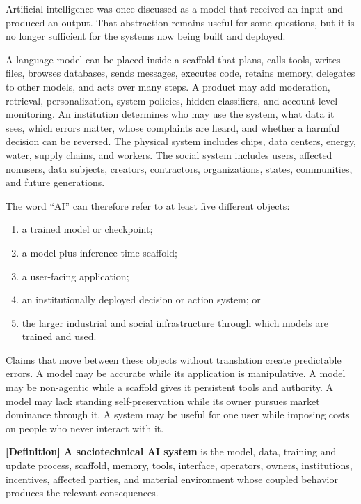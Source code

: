 \documentclass[
  11pt,
]{article}
\providecommand{\tightlist}{%
  \setlength{\itemsep}{0pt}\setlength{\parskip}{0pt}}
\begin{document}
Artificial intelligence was once discussed as a model that received an
input and produced an output. That abstraction remains useful for some
questions, but it is no longer sufficient for the systems now being
built and deployed.

A language model can be placed inside a scaffold that plans, calls
tools, writes files, browses databases, sends messages, executes code,
retains memory, delegates to other models, and acts over many steps. A
product may add moderation, retrieval, personalization, system policies,
hidden classifiers, and account-level monitoring. An institution
determines who may use the system, what data it sees, which errors
matter, whose complaints are heard, and whether a harmful decision can
be reversed. The physical system includes chips, data centers, energy,
water, supply chains, and workers. The social system includes users,
affected nonusers, data subjects, creators, contractors, organizations,
states, communities, and future generations.

The word ``AI'' can therefore refer to at least five different objects:

\begin{enumerate}
\def\labelenumi{\arabic{enumi}.}
\tightlist
\item
  a trained model or checkpoint;
\item
  a model plus inference-time scaffold;
\item
  a user-facing application;
\item
  an institutionally deployed decision or action system; or
\item
  the larger industrial and social infrastructure through which models
  are trained and used.
\end{enumerate}

Claims that move between these objects without translation create
predictable errors. A model may be accurate while its application is
manipulative. A model may be non-agentic while a scaffold gives it
persistent tools and authority. A model may lack standing
self-preservation while its owner pursues market dominance through it. A
system may be useful for one user while imposing costs on people who
never interact with it.

\textbf{{[}Definition{]} A sociotechnical AI system} is the model, data,
training and update process, scaffold, memory, tools, interface,
operators, owners, institutions, incentives, affected parties, and
material environment whose coupled behavior produces the relevant
consequences.
\end{document}
